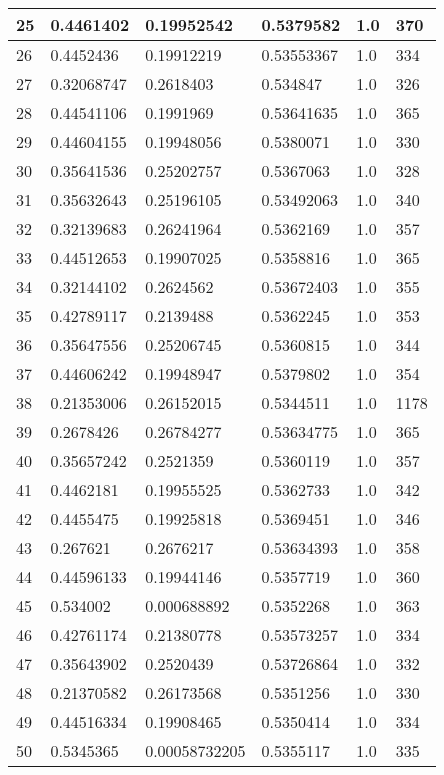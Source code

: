 \begin{longtable}{|l|l|l|l|l|l|}
25 & 0.4461402 & 0.19952542 & 0.5379582 & 1.0 & 370 \\ \hline 
26 & 0.4452436 & 0.19912219 & 0.53553367 & 1.0 & 334 \\ \hline 
27 & 0.32068747 & 0.2618403 & 0.534847 & 1.0 & 326 \\ \hline 
28 & 0.44541106 & 0.1991969 & 0.53641635 & 1.0 & 365 \\ \hline 
29 & 0.44604155 & 0.19948056 & 0.5380071 & 1.0 & 330 \\ \hline 
30 & 0.35641536 & 0.25202757 & 0.5367063 & 1.0 & 328 \\ \hline 
31 & 0.35632643 & 0.25196105 & 0.53492063 & 1.0 & 340 \\ \hline 
32 & 0.32139683 & 0.26241964 & 0.5362169 & 1.0 & 357 \\ \hline 
33 & 0.44512653 & 0.19907025 & 0.5358816 & 1.0 & 365 \\ \hline 
34 & 0.32144102 & 0.2624562 & 0.53672403 & 1.0 & 355 \\ \hline 
35 & 0.42789117 & 0.2139488 & 0.5362245 & 1.0 & 353 \\ \hline 
36 & 0.35647556 & 0.25206745 & 0.5360815 & 1.0 & 344 \\ \hline 
37 & 0.44606242 & 0.19948947 & 0.5379802 & 1.0 & 354 \\ \hline 
38 & 0.21353006 & 0.26152015 & 0.5344511 & 1.0 & 1178 \\ \hline 
39 & 0.2678426 & 0.26784277 & 0.53634775 & 1.0 & 365 \\ \hline 
40 & 0.35657242 & 0.2521359 & 0.5360119 & 1.0 & 357 \\ \hline 
41 & 0.4462181 & 0.19955525 & 0.5362733 & 1.0 & 342 \\ \hline 
42 & 0.4455475 & 0.19925818 & 0.5369451 & 1.0 & 346 \\ \hline 
43 & 0.267621 & 0.2676217 & 0.53634393 & 1.0 & 358 \\ \hline 
44 & 0.44596133 & 0.19944146 & 0.5357719 & 1.0 & 360 \\ \hline 
45 & 0.534002 & 0.000688892 & 0.5352268 & 1.0 & 363 \\ \hline 
46 & 0.42761174 & 0.21380778 & 0.53573257 & 1.0 & 334 \\ \hline 
47 & 0.35643902 & 0.2520439 & 0.53726864 & 1.0 & 332 \\ \hline 
48 & 0.21370582 & 0.26173568 & 0.5351256 & 1.0 & 330 \\ \hline 
49 & 0.44516334 & 0.19908465 & 0.5350414 & 1.0 & 334 \\ \hline 
50 & 0.5345365 & 0.00058732205 & 0.5355117 & 1.0 & 335 \\ \hline 
\end{longtable}